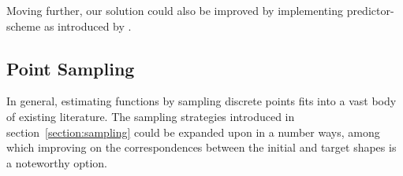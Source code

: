 Moving further, our solution could also be improved by implementing
predictor-scheme as introduced by \citet{holl2019pdecontrol}.

\subsection*{Point Sampling}
In general, estimating functions by sampling discrete points fits into a vast
body of existing literature. The sampling strategies introduced in
section~\ref{section:sampling} could be expanded upon in a number ways, among
which improving on the correspondences between the initial and target shapes is
a noteworthy option.


